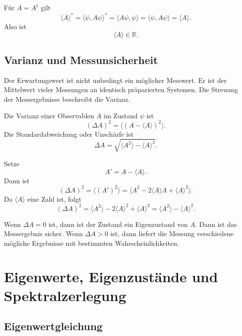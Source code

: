 \begin{derivationbox}
Für $A=A^\dagger$ gilt
\[
    \langle A\rangle^*
    =\langle \psi,A\psi\rangle^*
    =\langle A\psi,\psi\rangle
    =\langle \psi,A\psi\rangle
    =\langle A\rangle.
\]
Also ist
\[
    \langle A\rangle\in\mathbb R.
\]
\end{derivationbox}

\subsection{Varianz und Messunsicherheit}

Der Erwartungswert ist nicht unbedingt ein möglicher Messwert. Er ist der Mittelwert vieler Messungen an identisch präparierten Systemen. Die Streuung der Messergebnisse beschreibt die Varianz.

\begin{definitionbox}
Die Varianz einer Observablen $A$ im Zustand $\psi$ ist
\[
    (\Delta A)^2
    =\langle (A-\langle A\rangle)^2\rangle.
\]
Die Standardabweichung oder Unschärfe ist
\[
    \Delta A=\sqrt{\langle A^2\rangle-\langle A\rangle^2}.
\]
\end{definitionbox}

\begin{derivationbox}
Setze
\[
    A'=A-\langle A\rangle.
\]
Dann ist
\[
    (\Delta A)^2=\langle (A')^2\rangle
    =\langle A^2-2\langle A\rangle A+\langle A\rangle^2\rangle.
\]
Da $\langle A\rangle$ eine Zahl ist, folgt
\[
    (\Delta A)^2=\langle A^2\rangle-2\langle A\rangle^2+\langle A\rangle^2
    =\langle A^2\rangle-\langle A\rangle^2.
\]
\end{derivationbox}

\begin{conceptbox}
Wenn $\Delta A=0$ ist, dann ist der Zustand ein Eigenzustand von $A$. Dann ist das Messergebnis sicher. Wenn $\Delta A>0$ ist, dann liefert die Messung verschiedene mögliche Ergebnisse mit bestimmten Wahrscheinlichkeiten.
\end{conceptbox}

\section{Eigenwerte, Eigenzustände und Spektralzerlegung}

\subsection{Eigenwertgleichung}

